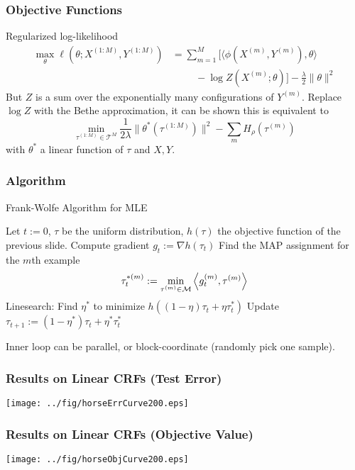 \documentclass{beamer}
\begin{document}
\begin{frame}
  \frametitle{Objective Functions}
  Regularized log-likelihood
  \begin{align*}
  \max_\theta \ell(\theta;X^{(1:M)},Y^{(1:M)}) &= \sum_{m=1}^M \Big[\langle\phi(X^{(m)},Y^{(m)}),\theta\rangle\\
  &\hspace{1cm} - \log Z(X^{(m)};\theta)\Big] - \frac{\lambda}{2}\|\theta\|^2
  \end{align*}
  But $Z$ is a sum over the exponentially many configurations of $Y^{(m)}$. Replace $\log Z$ with the Bethe approximation, it can be shown this is equivalent to
  \begin{equation*}
    \min_{\tau^{(1:M)}\in\mathcal{T}^M} \frac{1}{2\lambda}\|\theta^*(\tau^{(1:M)})\|^2 - \sum_m H_\rho(\tau^{(m)})
  \end{equation*}
  with $\theta^{*}$ a linear function of $\tau$ and $X, Y$.
\end{frame}

\begin{frame}
  \frametitle{Algorithm}
  \begin{algorithm}[H]
      \caption{Frank-Wolfe Algorithm for MLE}
    \begin{algorithmic}
      \State Let $t := 0$, $\tau$ be the uniform distribution, $h(\tau)$ the objective function of the previous slide.
      \Repeat
        \State Compute gradient $g_t := \nabla h(\tau_t)$
          \State Find the MAP assignment for the $m$th example $$\tau_{t}^{*(m)}:=\min_{\tau^{(m)}\in{\cal M}}\left\langle g^{(m)}_t,\tau^{(m)}\right\rangle$$
        \EndFor
        \State Linesearch: Find $\eta^{*}$ to minimize $h((1 - \eta)\tau_t + \eta\tau_{t}^{*})$
        \State Update $\tau_{t+1} := (1 - \eta^{*})\tau_t + \eta^{*}\tau_{t}^{*}$
       
    \end{algorithmic}
  \end{algorithm}
  Inner loop can be parallel, or block-coordinate (randomly pick one sample).
\end{frame}

\begin{frame}
  \frametitle{Results on Linear CRFs (Test Error)}
  \texttt{[image: ../fig/horseErrCurve200.eps]}
\end{frame}

\begin{frame}
  \frametitle{Results on Linear CRFs (Objective Value)}
  \texttt{[image: ../fig/horseObjCurve200.eps]}
\end{frame}
\end{document}
